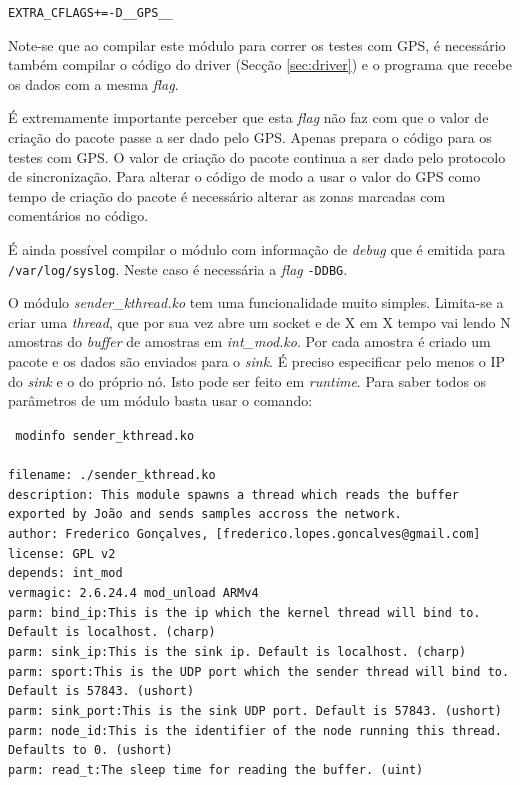 \documentclass[10pt,a4paper,oneside]{book}
\begin{document}
    \begin{center}
      {\tt EXTRA\_CFLAGS+=-D\_\_GPS\_\_}
    \end{center}

    Note-se que ao compilar este módulo para correr os testes com GPS, é necessário também compilar o código do driver (Secção \ref{sec:driver}) e o programa que recebe os dados com a mesma \emph{flag}.

    É extremamente importante perceber que esta \emph{flag} não faz com que o valor de criação do pacote passe a ser dado pelo GPS. Apenas prepara o código para os testes com GPS. O valor de criação do pacote continua a ser dado pelo protocolo de sincronização. Para alterar o código de modo a usar o valor do GPS como tempo de criação do pacote é necessário alterar as zonas marcadas com comentários no código.

    É ainda possível compilar o módulo com informação de \emph{debug} que é emitida para {\tt /var/log/syslog}. Neste caso é necessária a \emph{flag} {\tt -DDBG}.

    O módulo \emph{sender\_kthread.ko} tem uma funcionalidade muito simples. Limita-se a criar uma \emph{thread}, que por sua vez abre um socket e de X em X tempo vai lendo N amostras do \emph{buffer} de amostras em \emph{int\_mod.ko}. Por cada amostra é criado um pacote e os dados são enviados para o \emph{sink}. É preciso especificar pelo menos o IP do \emph{sink} e o do próprio nó. Isto pode ser feito em \emph{runtime}. Para saber todos os parâmetros de um módulo basta usar o comando:

    \begin{flushleft}
      {\tt 
        modinfo sender\_kthread.ko\\\hfill\\
        filename:       ./sender\_kthread.ko\\
        description:    This module spawns a thread which reads the buffer exported by João and
                        sends samples accross the network.\\
        author:         Frederico Gonçalves, [frederico.lopes.goncalves@gmail.com]\\
        license:        GPL v2\\
        depends:        int\_mod\\
        vermagic:       2.6.24.4 mod\_unload ARMv4 \\
        parm:           bind\_ip:This is the ip which the kernel thread will bind to. Default is localhost. (charp)\\
        parm:           sink\_ip:This is the sink ip. Default is localhost. (charp)\\
        parm:           sport:This is the UDP port which the sender thread will bind to. Default is 57843. (ushort)\\
        parm:           sink\_port:This is the sink UDP port. Default is 57843. (ushort)\\
        parm:           node\_id:This is the identifier of the node running this thread. Defaults to 0. (ushort)\\
        parm:           read\_t:The sleep time for reading the buffer. (uint)
      }
    \end{flushleft}
\end{document}
